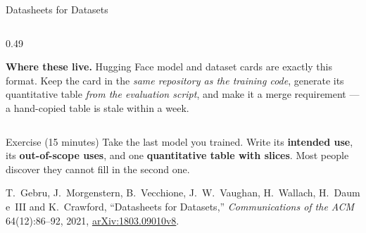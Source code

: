 \begin{frame}[allowframebreaks]{Datasheets for Datasets}
\begin{columns}[T]
\begin{column}{0.49\textwidth}
            \vspace{0.12em}
            \begin{tcolorbox}[colback=raiGreen!5, colframe=raiGreen!60, boxrule=0.6pt]
                \scriptsize \textbf{Where these live.} Hugging Face model and dataset cards are
                exactly this format. Keep the card in the \emph{same repository as the training
                code}, generate its quantitative table \emph{from the evaluation script}, and make
                it a merge requirement --- a hand-copied table is stale within a week.
            \end{tcolorbox}
        \end{column}
    \end{columns}

    \vspace{0.12em}
    \begin{block}{Exercise (15 minutes)}
        \centering
        \scriptsize Take the last model you trained. Write its \textbf{intended use}, its
        \textbf{out-of-scope uses}, and one \textbf{quantitative table with slices}.
        Most people discover they cannot fill in the second one.
    \end{block}

    \vspace{0.09em}
    {\scriptsize T.~Gebru, J.~Morgenstern, B.~Vecchione, J.~W.~Vaughan, H.~Wallach, H.~Daum e~III
    and K.~Crawford, ``Datasheets for Datasets,'' \emph{Communications of the ACM} 64(12):86--92,
    2021, \href{https://arxiv.org/abs/1803.09010v8}{arXiv:1803.09010v8}.}
\end{frame}
